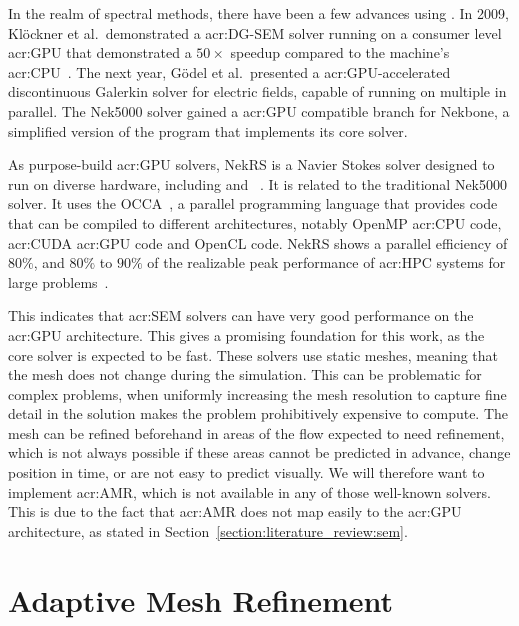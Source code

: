In the realm of spectral methods, there have been a few advances using . In
2009, Klöckner et al.\ demonstrated a \acrshort{acr:DG-SEM} solver running on a consumer level
\acrshort{acr:GPU} that demonstrated a \(50 \times \) speedup compared to the machine's
\acrshort{acr:CPU}~\cite{Klockner2009}. The next year, Gödel et al.\ presented a
\acrshort{acr:GPU}-accelerated discontinuous Galerkin solver for electric fields, capable of running
on multiple  in parallel. The Nek5000 solver gained a \acrshort{acr:GPU}
compatible branch for Nekbone, a simplified version of the program that implements its core solver.

As purpose-build \acrshort{acr:GPU} solvers, NekRS is a Navier Stokes solver designed to run on
diverse hardware, including  and ~\cite{Fischer2021}. It is
related to the traditional Nek5000 solver. It uses the OCCA~\cite{Medina2014}, a parallel
programming language that provides code that can be compiled to different architectures, notably
OpenMP \acrshort{acr:CPU} code, \acrshort{acr:CUDA} \acrshort{acr:GPU} code and OpenCL code. NekRS
shows a parallel efficiency of \(80 \% \), and \(80 \% \) to \(90 \% \) of the realizable peak
performance of \acrshort{acr:HPC} systems for large problems~\cite{Fischer2021}.

This indicates that \acrshort{acr:SEM} solvers can have very good performance on the
\acrshort{acr:GPU} architecture. This gives a promising foundation for this work, as the core solver
is expected to be fast. These solvers use static meshes, meaning that the mesh does not change
during the simulation. This can be problematic for complex problems, when uniformly increasing the
mesh resolution to capture fine detail in the solution makes the problem prohibitively expensive to
compute. The mesh can be refined beforehand in areas of the flow expected to need refinement, which
is not always possible if these areas cannot be predicted in advance, change position in time, or
are not easy to predict visually. We will therefore want to implement \acrlong{acr:AMR}, which is
not available in any of those well-known solvers. This is due to the fact that \acrlong{acr:AMR}
does not map easily to the \acrshort{acr:GPU} architecture, as stated in
Section~\ref{section:literature_review:sem}. 

\section{Adaptive Mesh Refinement}\label{section:literature_review:amr}

